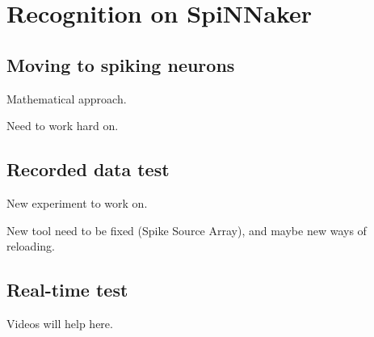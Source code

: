 \chapter{Recognition on SpiNNaker}
\label{cha:rsp}

\section{Moving to spiking neurons}
\label{sec:msn}
Mathematical approach.

Need to work hard on.

\section{Recorded data test}
\label{sec:rdt}
New experiment to work on.

New tool need to be fixed (Spike Source Array), and maybe new ways of reloading.

\section{Real-time test}
\label{sec:rtt}
Videos will help here.
